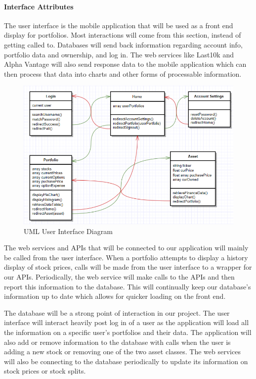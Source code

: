 \documentclass[onecolumn, draftclsnofoot,10pt, compsoc]{IEEEtran}
\begin{document}
\paragraph{Interface Attributes}

    The user interface is the mobile application that will be used as a front end display for portfolios. Most
    interactions will come from this section, instead of getting called to. Databases will send back information
    regarding account info, portfolio data and ownership, and log in. The web services like Last10k and Alpha Vantage
     will also send response data to the mobile application which can then process that data into charts 
    and other forms of processable information.

\begin{figure}[h]
\centering
\captionsetup{justification=centering}
\includegraphics[width=14cm]{design/frontend.png}
\caption{UML User Interface Diagram}
\end{figure}
    
    The web services and APIs that will be connected to our application will mainly be called from the user
    interface. When a portfolio attempts to display a history display of stock prices, calls will be made from the user
    interface to a wrapper for our APIs. Periodically, the web service will make calls to the APIs and 
    then report this information to the database. This will continually keep our database's information
    up to date which allows for quicker loading on the front end.
    
    The database will be a strong point of interaction in our project. The user interface will interact heavily
    post log in of a user as the application will load all the information on a specific user's portfolios and their
    data. The application will also add or remove information to the database with calls when the user is adding 
    a new stock or removing one of the two asset classes. The web services will also be connecting to the database periodically to update its information on stock prices or stock splits.
\end{document}
